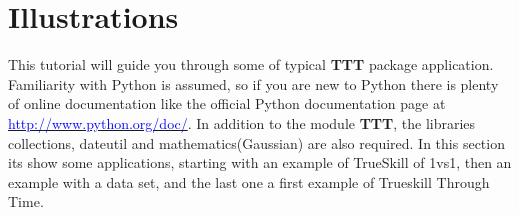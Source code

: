 \documentclass[article]{jss}
\newcommand{\fct}[1]{\code{#1()}}
\begin{document}


\section{Illustrations} \label{sec:illustrations}

%
\begin{comment}


\begin{CodeChunk}
\begin{CodeInput}
R> data("quine", package = "MASS")
\end{CodeInput}
\end{CodeChunk}

\begin{leftbar}
For code input and output, the style files provide dedicated environments.
Either the ``agnostic'' \verb|{CodeInput}| and \verb|{CodeOutput}| can be used
or, equivalently, the environments \verb|{Sinput}| and \verb|{Soutput}| as
produced by \fct{Sweave} or \pkg{knitr} when using the \code{render_sweave()}
hook. Please make sure that all code is properly spaced, e.g., using
\code{y = a + b * x} and \emph{not} \code{y=a+b*x}. Moreover, code input should
use ``the usual'' command prompt in the respective software system. For
\proglang{R} code, the prompt \code{"R> "} should be used with \code{"+  "} as
the continuation prompt. Generally, comments within the code chunks should be
avoided -- and made in the regular {\LaTeX} text instead. Finally, empty lines
before and after code input/output should be avoided (see above).
\end{leftbar}
\end{comment}

This tutorial will guide you through some of typical \textbf{TTT} package application.
Familiarity with Python is assumed, so if you are new to Python there is plenty of online documentation like the official Python documentation
page at \href{http://www.python.org/doc/}{\textcolor{blue}{http://www.python.org/doc/}}.
In addition to the module \textbf{TTT}, the libraries collections, dateutil and mathematics(Gaussian) are also required.
In this section its show some applications, starting with an example of TrueSkill of 1vs1, then an example with a data set, and the last one a first example of Trueskill Through Time.
\end{document}

